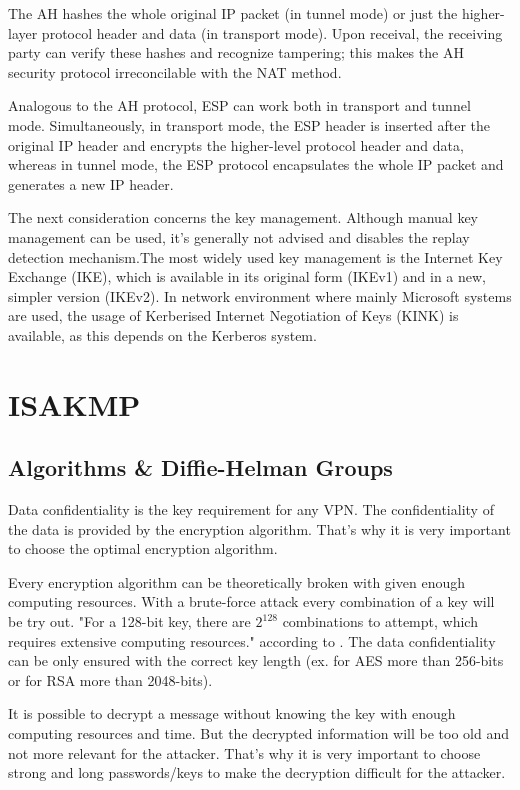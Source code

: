 \documentclass[a4paper]{report}
\begin{document}
The AH hashes the whole original IP packet (in tunnel mode) or just the higher-layer protocol header and data (in transport mode). Upon receival, the receiving party can verify these hashes and recognize tampering; this makes the AH security protocol irreconcilable with the NAT method. \parencite[2-11]{Kent2005AH}

Analogous to the AH protocol, ESP can work both in transport and tunnel mode. Simultaneously, in transport mode, the ESP header is inserted after the original IP header and encrypts the higher-level protocol header and data, whereas in tunnel mode, the ESP protocol encapsulates the whole IP packet and generates a new IP header. \parencite[18-20]{Kent2005ESP}

The next consideration concerns the key management. Although manual key management can be used, it's generally not advised and disables the replay detection mechanism.The most widely used key management is the Internet Key Exchange (IKE), which is available in its original form (IKEv1) and in a new, simpler version (IKEv2). In network environment where mainly Microsoft systems are used, the usage of Kerberised Internet Negotiation of Keys (KINK) is available, as this depends on the Kerberos system. \parencite[4-5]{Bellovin2009}

\section{ISAKMP}
\label{sec:ISAKMP}

\subsection{Algorithms \& Diffie-Helman Groups}
\label{ssec:AlgoDH}
Data confidentiality is the key requirement for any VPN. The confidentiality of the data is provided by the encryption algorithm. That's why it is very important to choose the optimal encryption algorithm. \parencite{Snader2006}

Every encryption algorithm can be theoretically broken with given enough computing resources. With a brute-force attack every combination of a key will be try out. "For a 128-bit key, there are $2^{128}$ combinations to attempt, which requires extensive computing resources." according to \cite{HigashiMichael2013}. 
The data confidentiality can be only ensured with the correct key length (ex. for AES more than 256-bits or for RSA more than 2048-bits). 

It is possible to decrypt a message without knowing the key with enough computing resources and time. But the decrypted information will be too old and not more relevant for the attacker. 
That's why it is very important to choose strong and long passwords/keys to make the decryption difficult for the attacker.\parencite{HigashiMichael2013}
\end{document}
